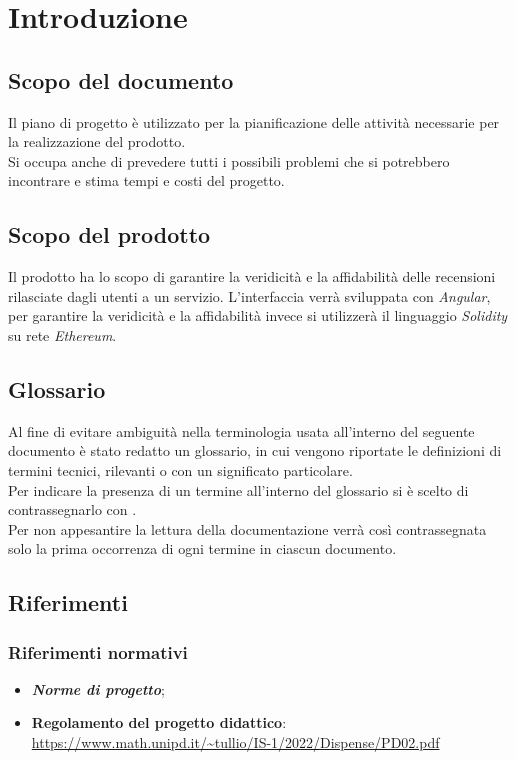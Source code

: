 \section{Introduzione}

\subsection{Scopo del documento}
Il piano di progetto è utilizzato per la pianificazione delle attività necessarie per la realizzazione del prodotto. \\
Si occupa anche di prevedere tutti i possibili problemi che si potrebbero incontrare e stima tempi e costi del progetto.

\subsection{Scopo del prodotto}
Il prodotto ha lo scopo di garantire la veridicità e la affidabilità 
delle recensioni rilasciate dagli utenti a un servizio. L'interfaccia verrà
sviluppata con \textit{Angular}, per garantire la veridicità e la affidabilità 
invece si utilizzerà il linguaggio \textit{Solidity} su rete \textit{Ethereum}.

\subsection{Glossario}
Al fine di evitare ambiguità nella terminologia usata all'interno del seguente
documento è stato redatto un glossario, in cui vengono riportate le definizioni
di termini tecnici, rilevanti o con un significato particolare. \\ Per indicare
la presenza di un termine all'interno del glossario si è scelto di
contrassegnarlo con \glo.\\ Per non appesantire la lettura della documentazione
verrà così contrassegnata solo la prima occorrenza di ogni termine in ciascun
documento.

\subsection{Riferimenti}
    \subsubsection{Riferimenti normativi}
    \begin{itemize}
        \item \textbf{\textit{Norme di progetto}};
        \item \textbf{Regolamento del progetto didattico}: \\
        \url{https://www.math.unipd.it/~tullio/IS-1/2022/Dispense/PD02.pdf}
    \end{itemize}
